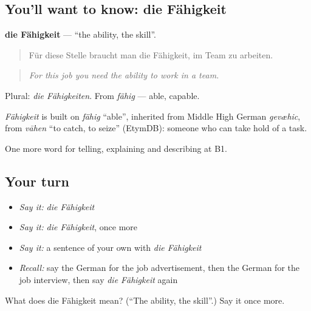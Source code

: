 \subsection*{You'll want to know: die Fähigkeit}
\textbf{die Fähigkeit} — \textquotedblleft{}the ability, the skill\textquotedblright{}.

\begin{quote}
Für diese Stelle braucht man die Fähigkeit, im Team zu arbeiten.
\end{quote}

\begin{quote}
\emph{For this job you need the ability to work in a team.}
\end{quote}

Plural: \emph{die Fähigkeiten}. From \emph{fähig} — able, capable.

\begin{cousinweb}
\emph{Fähigkeit} is built on \emph{fähig} \textquotedblleft{}able\textquotedblright{}, inherited from Middle High German \emph{gevæhic}, from \emph{vāhen} \textquotedblleft{}to catch, to seize\textquotedblright{} (EtymDB): someone who can take hold of a task.
\end{cousinweb}

\begin{grammarlens}[title={What you've built}]
One more word for telling, explaining and describing at B1.
\end{grammarlens}

\subsection*{Your turn}
\begin{itemize}
\raggedright
  \item \emph{Say it:} \emph{die Fähigkeit}
  \item \emph{Say it:} \emph{die Fähigkeit}, once more
  \item \emph{Say it:} a sentence of your own with \emph{die Fähigkeit}
  \item \emph{Recall:} say the German for the job advertisement, then the German for the job interview, then say \emph{die Fähigkeit} again
\end{itemize}

\begin{tcolorbox}[breakable,colback=teal!4,colframe=teal!35!black,title={Before you move on}]
What does die Fähigkeit mean? (\textquotedblleft{}The ability, the skill\textquotedblright{}.) Say it once more.
\end{tcolorbox}
